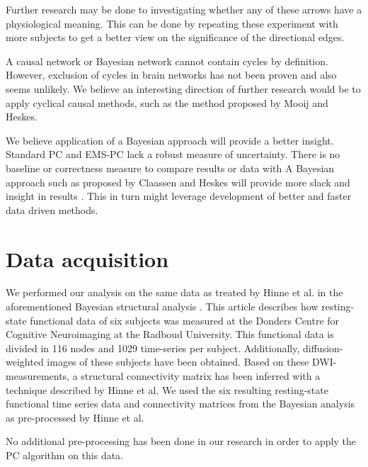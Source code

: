 \documentclass[a4paper, 10pt, english, onecolumn]{article}
\begin{document}
Further research may be done to investigating whether any of these arrows have a physiological meaning.
This can be done by repeating these experiment with more subjects to get a better view on the significance of the directional edges.

A causal network or Bayesian network cannot contain cycles by definition.
However, exclusion of cycles in brain networks has not been proven and also seems unlikely.
We believe an interesting direction of further research would be to apply cyclical causal methods, such as the method proposed by Mooij and Heskes\cite{Mooij20013}.

We believe application of a Bayesian approach will provide a better insight.
Standard PC and EMS-PC lack a robust measure of uncertainty.
There is no baseline or correctness measure to compare results or data with
A Bayesian approach such as proposed by Claassen and Heskes will provide more slack and insight in results \cite{claassen2012}.
This in turn might leverage development of better and faster data driven methods.





{}


\appendix
\section{Data acquisition}\label{sec:data}
We performed our analysis on the same data as treated by Hinne et al. in the aforementioned Bayesian structural analysis \cite{hinne2013, hinne2013structfunc}.
This article describes how resting-state functional data of six subjects was measured at the Donders Centre for Cognitive Neuroimaging at the Radboud University.
This functional data is divided in 116 nodes and 1029 time-series per subject.
Additionally, diffusion-weighted images of these subjects have been obtained.
Based on these DWI-measurements, a structural connectivity matrix has been inferred with a technique described by Hinne et al.
We used the six resulting resting-state functional time series data and connectivity matrices from the Bayesian analysis as pre-processed by Hinne et al.

No additional pre-processing has been done in our research in order to apply the PC algorithm on this data.
\end{document}
